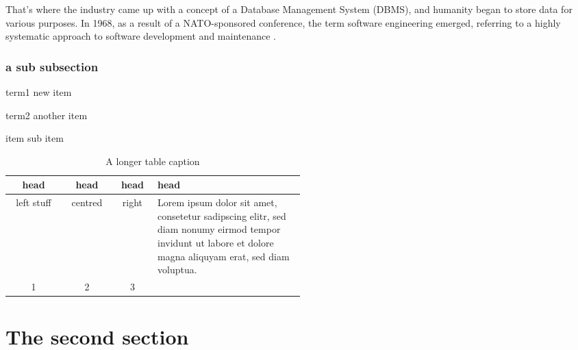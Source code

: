 \hspace{2cm}

That’s where the industry came up with a concept of a Database Management System (DBMS), and humanity began to store data for various purposes. In 1968, as a result of a NATO-sponsored conference, the term software engineering emerged, referring to a highly systematic approach to software development and maintenance \cite{Wirth2008}.




\subsubsection{a sub subsection}



\begin{description*}
	\item[term1] new item
	\item[term2] another item
	\begin{description*}
		\item[item] sub item
	\end{description*}
\end{description*}



\begin{table}
	\centering
	\caption[a short caption]{A longer table caption}
	\begin{tabular}{|ccc|p{0.5\linewidth}|}
		\toprule
		\textbf{head} & \textbf{head} & \textbf{head} & \textbf{head}                                                                                                                                               \\
		\hline \hline
		left stuff    & centred       & right         & Lorem ipsum dolor sit amet, consetetur sadipscing elitr, sed diam nonumy eirmod tempor invidunt ut labore et dolore magna aliquyam erat, sed diam voluptua. \\
		\hline
		1             & 2             & 3             &                                                                                                                                                             \\
		\hline
	\end{tabular}\end{table}

\section{The second section} \label{sec:section2}
\nobreak

